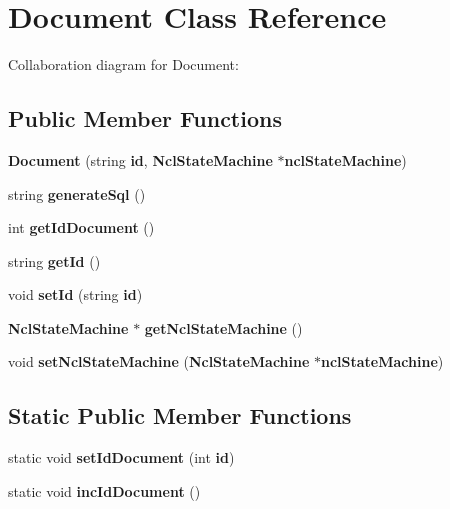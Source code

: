 \section{Document Class Reference}
\label{classbr_1_1ufscar_1_1lince_1_1ginga_1_1recommender_1_1Document}
Collaboration diagram for Document:\subsection*{Public Member Functions}
\begin{CompactItemize}
\item 
\textbf{Document} (string {\bf id}, {\bf NclStateMachine} $\ast${\bf nclStateMachine})\label{classbr_1_1ufscar_1_1lince_1_1ginga_1_1recommender_1_1Document_d64946d687c192341b1b38a541db03db}

\item 
string \textbf{generateSql} ()\label{classbr_1_1ufscar_1_1lince_1_1ginga_1_1recommender_1_1Document_8f1e45f781da9a5727416350efd7d586}

\item 
int \textbf{getIdDocument} ()\label{classbr_1_1ufscar_1_1lince_1_1ginga_1_1recommender_1_1Document_bf5c20b93a957d75685e4dc1cb742831}

\item 
string \textbf{getId} ()\label{classbr_1_1ufscar_1_1lince_1_1ginga_1_1recommender_1_1Document_bba5652b12c4d6161f860eb44d5789d8}

\item 
void \textbf{setId} (string {\bf id})\label{classbr_1_1ufscar_1_1lince_1_1ginga_1_1recommender_1_1Document_09363425ca175437f0ec328d404ab88a}

\item 
{\bf NclStateMachine} $\ast$ \textbf{getNclStateMachine} ()\label{classbr_1_1ufscar_1_1lince_1_1ginga_1_1recommender_1_1Document_5e6b308c95d6ed798ba2fd272fda10f2}

\item 
void \textbf{setNclStateMachine} ({\bf NclStateMachine} $\ast${\bf nclStateMachine})\label{classbr_1_1ufscar_1_1lince_1_1ginga_1_1recommender_1_1Document_74cc398e7468a62020d4e8d4c3b8f050}

\end{CompactItemize}
\subsection*{Static Public Member Functions}
\begin{CompactItemize}
\item 
static void \textbf{setIdDocument} (int {\bf id})\label{classbr_1_1ufscar_1_1lince_1_1ginga_1_1recommender_1_1Document_d92514b3cd5461661b1f2921b74172c9}

\item 
static void \textbf{incIdDocument} ()\label{classbr_1_1ufscar_1_1lince_1_1ginga_1_1recommender_1_1Document_0dcc713434271b237f8ae24df7155793}

\end{CompactItemize}
